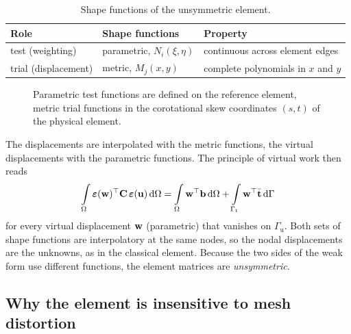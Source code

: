 \begin{table}[htbp]
  \centering
  \caption{Shape functions of the unsymmetric element.}
  \label{tab:spaces}
  \begin{tabular}{@{}lll@{}}
    \toprule
    Role & Shape functions & Property \\
    \midrule
    test (weighting) & parametric, $N_i(\xi,\eta)$ &
      continuous across element edges \\
    trial (displacement) & metric, $M_j(x,y)$ &
      complete polynomials in $x$ and $y$ \\
    \bottomrule
  \end{tabular}
\end{table}

\begin{figure}[htbp]
  \centering
  
  \caption{Parametric test functions are defined on the reference element,
    metric trial functions in the corotational skew coordinates $(s,t)$ of the
    physical element.}
  \label{fig:spaces}
\end{figure}

The displacements are interpolated with the metric functions, the virtual
displacements with the parametric functions. The principle of virtual work then
reads
\begin{equation}
  \int\limits_{\Omega} \bm\varepsilon(\mathbf{w})^{\top}\mathbf{C}\,\bm\varepsilon(\mathbf{u})\,\mathrm{d}\Omega
  = \int\limits_{\Omega} \mathbf{w}^{\top}\mathbf{b}\,\mathrm{d}\Omega
  + \int\limits_{\Gamma_\mathrm{t}} \mathbf{w}^{\top}\bar{\mathbf{t}}\,\mathrm{d}\Gamma
  \label{eq:weakform}
\end{equation}
for every virtual displacement $\mathbf{w}$ (parametric) that vanishes on
$\Gamma_\mathrm{u}$. Both sets of shape functions are interpolatory at the same
nodes, so the nodal displacements are the unknowns, as in the classical element.
Because the two sides of the weak form use different functions, the element
matrices are \emph{unsymmetric}.

\subsection*{Why the element is insensitive to mesh distortion}

